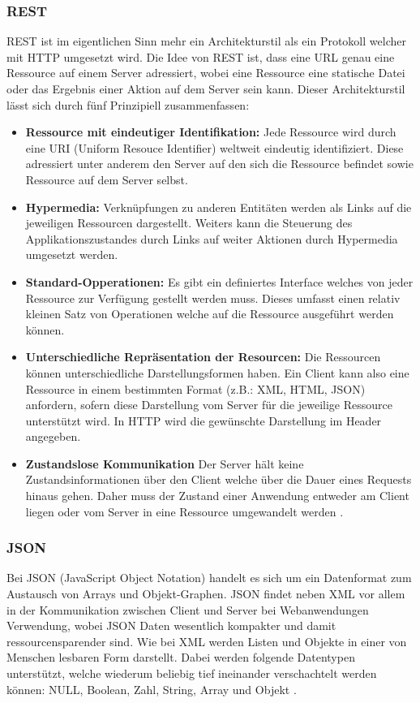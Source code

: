 \subsubsection{REST}
\label{sec:HTTP}
REST ist im eigentlichen Sinn mehr ein Architekturstil als ein Protokoll welcher mit HTTP umgesetzt wird.
Die Idee von REST ist, dass eine URL genau eine Ressource auf einem Server adressiert, 
wobei eine Ressource eine statische Datei oder das Ergebnis einer Aktion auf dem Server sein kann.
Dieser Architekturstil lässt sich durch fünf Prinzipiell zusammenfassen:
\begin{itemize}
	\item \textbf{Ressource mit eindeutiger Identifikation:}
		Jede Ressource wird durch eine URI (Uniform Resouce Identifier) weltweit eindeutig identifiziert.
		Diese adressiert unter anderem den Server auf den sich die Ressource befindet sowie Ressource auf dem Server selbst.
	\item \textbf{Hypermedia:}
		Verknüpfungen zu anderen Entitäten werden als Links auf die jeweiligen Ressourcen dargestellt.
		Weiters kann die Steuerung des Applikationszustandes durch Links auf weiter Aktionen durch Hypermedia umgesetzt werden.
	\item \textbf{Standard-Opperationen:}
		Es gibt ein definiertes Interface welches von jeder Ressource zur Verfügung gestellt werden muss.
		Dieses umfasst einen relativ kleinen Satz von Operationen welche auf die Ressource ausgeführt werden können.
	\item \textbf{Unterschiedliche Repräsentation der Resourcen:}
		Die Ressourcen können unterschiedliche Darstellungsformen haben.
		Ein Client kann also eine Ressource in einem bestimmten Format (z.B.: XML, HTML, JSON) anfordern,
		sofern diese Darstellung vom Server für die jeweilige Ressource unterstützt wird.
		In HTTP wird die gewünschte Darstellung im Header angegeben.
	\item \textbf{Zustandslose Kommunikation}
		Der Server hält keine Zustandsinformationen über den Client welche über die Dauer eines Requests hinaus gehen.
		Daher muss der Zustand einer Anwendung entweder am Client liegen oder vom Server in eine Ressource umgewandelt werden \cite{rest}. 
\end{itemize}


\subsubsection{JSON}
\label{sec:JSON}
Bei JSON (JavaScript Object Notation) handelt es sich um ein Datenformat zum Austausch von Arrays und Objekt-Graphen.
JSON findet neben XML vor allem in der Kommunikation zwischen Client und Server bei Webanwendungen Verwendung, 
wobei JSON Daten wesentlich kompakter und damit ressourcensparender sind.
Wie bei XML werden Listen und Objekte in einer von Menschen lesbaren Form darstellt.
Dabei werden folgende Datentypen unterstützt, welche wiederum beliebig tief ineinander verschachtelt werden können: NULL, Boolean, Zahl, String, Array und Objekt \cite{ajax}.

